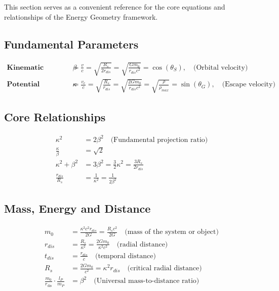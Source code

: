 \documentclass{article}
\begin{document}
\begin{theorem}
This section serves as a convenient reference for the core equations and relationships of the Energy Geometry framework.

\subsection{Fundamental Parameters}

\begin{align}
   \textbf{Kinematic projection} \quad  \beta &=  \frac{v}{c} = \sqrt{\frac{R_s}{2r_{dis}}} = \sqrt{\frac{Gm_0}{r_{dis}c^2}} = \cos\left(\theta_S\right), \quad \text{(Orbital velocity)} \\
 \textbf{Potential projection} \quad  \kappa &= \frac{v_e}{c} = \sqrt{\frac{R_s}{r_{dis}}} = \sqrt{\frac{2Gm_0}{r_{dis}c^2}} = \sqrt{\frac{\rho}{\rho_{max}}}= \sin\left(\theta_G\right), \quad \text{(Escape velocity)}
\end{align}

\subsection{Core Relationships}

\begin{align}
    \kappa^2 &= 2\beta^2 \quad \text{(Fundamental projection ratio)} \\
    \frac{\kappa}{\beta} &= \sqrt{2} \\
    \kappa^2 + \beta^2 &= 3\beta^2 = \frac{3}{2}\kappa^2 = \frac{3R_s}{2r_{dis}} \\
    \frac{r_{dis}}{R_s} &= \frac{1}{\kappa^2} = \frac{1}{2\beta^2}
\end{align}

\subsection{Mass, Energy and Distance}

\begin{align}
    m_0 &= \frac{\kappa^2 c^2 r_{dis}}{2G} = \frac{R_s c^2}{2G} \quad \text{(mass of the system or object)} \\
    r_{dis} &= \frac{R_s}{\kappa^2} = \frac{2Gm_0}{\kappa^2 c^2}  \quad \text{(radial distance)}\\
    t_{dis} &= \frac{r_{dis}}{c}  \quad \text{(temporal distance)}\\
    R_s &= \frac{2Gm_0}{c^2}=\kappa^2 r_{dis} \quad \text{(critical radial distance)} \\
    \frac{m_0}{r_{\text{dis}}} \cdot \frac{l_P}{m_P} &= \beta^2 \quad \text{(Universal mass-to-distance ratio)}
\end{align}


\end{theorem}
\end{document}
